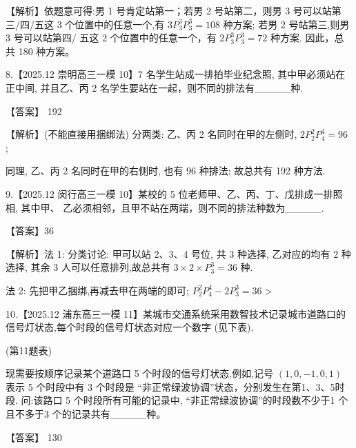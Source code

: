 \documentclass[10pt]{article}
\newcommand*\circled[1]{\tikz[baseline=(char.base)]{\node[shape=circle,draw,inner sep=1.5pt] (char) {\small #1};}}
\begin{document}
【解析】依题意可得:男 1 号肯定站第一；若男 2 号站第二，则男 3 号可以站第三/四/五这 3 个位置中的任意一个,有 \(3{P}_{3}^{3}{P}_{3}^{3} = {108}\) 种方案; 若男 2 号站第三,则男 3 号可以站第四/ 五这 2 个位置中的任意一个，有 \(2{P}_{3}^{3}{P}_{3}^{3} = {72}\) 种方案. 因此，总共 180 种方案。

8.【2025.12 崇明高三一模 10】7 名学生站成一排拍毕业纪念照, 其中甲必须站在正中间, 并且乙、丙 2 名学生要站在一起，则不同的排法有\_\_\_\_\_种.

【答案】 192

【解析】(不能直接用捆绑法) 分两类: 乙、丙 2 名同时在甲的左侧时, \(2{P}_{2}^{2}{P}_{4}^{4} = {96}\) ;

同理, 乙、丙 2 名同时在甲的右侧时, 也有 96 种排法; 故总共有 192 种方法.

9.【2025.12 闵行高三一模 10】某校的 5 位老师甲、乙、丙、丁、戊排成一排照相, 其中甲、 乙必须相邻，且甲不站在两端，则不同的排法种数为\_\_\_\_\_.

【答案】36

【解析】法 1: 分类讨论:  \circled{1}  甲可以站 2、3、4 号位, 共 3 种选择, 乙对应的均有 2 种选择, 其余 3 人可以任意排列,故总共有 \(3 \times  2 \times  {P}_{3}^{3} = {36}\) 种.

法 2: 先把甲乙捆绑,再减去甲在两端的即可; \({P}_{2}^{2}{P}_{4}^{4} - 2{P}_{3}^{3} = {36} >\)

10.【2025.12 浦东高三一模 11】某城市交通系统采用数智技术记录城市道路口的信号灯状态,每个时段的信号灯状态对应一个数字 (见下表).

\begin{center}
\end{center}

(第11题表)

现需要按顺序记录某个道路口 5 个时段的信号灯状态,例如,记号 \(\left( {1,0, - 1,0,1}\right)\) 表示 5 个时段中有 3 个时段是 “非正常绿波协调”状态，分别发生在第1、3、5时段. 问:该路口 5 个时段所有可能的记录中, “非正常绿波协调”的时段数不少于1 个且不多于3 个的记录共有\_\_\_\_\_种。

【答案】 130
\end{document}
